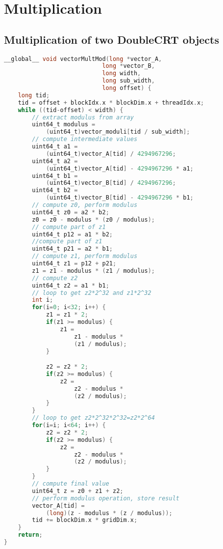 \section{Multiplication} \label{sec:KernelMultiplication}
\subsection{Multiplication of two DoubleCRT objects}
\begin{lstlisting}[language=C,caption={Multiplication Kernel for Two DoubleCRT}]
__global__ void vectorMultMod(long *vector_A, 
                            long *vector_B, 
                            long width, 
                            long sub_width, 
                            long offset) {
	long tid;
	tid = offset + blockIdx.x * blockDim.x + threadIdx.x;
	while ((tid-offset) < width) {
	    // extract modulus from array
		uint64_t modulus = 
		    (uint64_t)vector_moduli[tid / sub_width];
		// compute intermediate values
		uint64_t a1 = 
		    (uint64_t)vector_A[tid] / 4294967296;
		uint64_t a2 = 
		    (uint64_t)vector_A[tid] - 4294967296 * a1;
		uint64_t b1 = 
		    (uint64_t)vector_B[tid] / 4294967296;
		uint64_t b2 = 
		    (uint64_t)vector_B[tid] - 4294967296 * b1;
        // compute z0, perform modulus
		uint64_t z0 = a2 * b2;
		z0 = z0 - modulus * (z0 / modulus);
        // compute part of z1
		uint64_t p12 = a1 * b2;
        //compute part of z1
		uint64_t p21 = a2 * b1;
        // compute z1, perform modulus
		uint64_t z1 = p12 + p21;
		z1 = z1 - modulus * (z1 / modulus);
		// compute z2
		uint64_t z2 = a1 * b1;
        // loop to get z2*2^32 and z1*2^32
		int i;
		for(i=0; i<32; i++) {
			z1 = z1 * 2;
			if(z1 >= modulus) {
				z1 = 
				    z1 - modulus * 
				    (z1 / modulus);
			}

			z2 = z2 * 2;
			if(z2 >= modulus) {
				z2 = 
				    z2 - modulus * 
				    (z2 / modulus);
			}
		}
        // loop to get z2*2^32*2^32=z2*2^64
		for(i=i; i<64; i++) {
			z2 = z2 * 2;
			if(z2 >= modulus) {
				z2 = 
				    z2 - modulus *
				    (z2 / modulus);
			}
		}
        // compute final value
		uint64_t z = z0 + z1 + z2;
		// perform modulus operation, store result
		vector_A[tid] = 
		    (long)(z - modulus * (z / modulus));
		tid += blockDim.x * gridDim.x;
	}
	return;
}
\end{lstlisting}